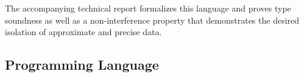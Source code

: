 The accompanying technical report \cite{EnerJ-TR} formalizes this language and
proves type soundness as well as a non-interference
property that demonstrates the desired isolation of approximate and
precise data.


\subsection{Programming Language}


\newcommand{\lit}{\mathcal{L}}
\newcommand{\lost}{\texttt{lost}}
\newcommand{\context}{\texttt{context}}
\renewcommand{\approx}{\texttt{approx}}
\newcommand{\precise}{\texttt{precise}}
\renewcommand{\top}{\texttt{top}}
\newcommand{\comb}{\ensuremath{\triangleright}}

\newcommand{\sG}{\ensuremath{\mathit{^{s}\!\Gamma}}}
\newcommand{\rG}{\ensuremath{\mathit{^{r}\!\Gamma}}}



\newcommand\predefskip[0]{\vspace{2mm plus1mm}\hspace*{3mm}}
\renewenvironment{ottdefnblock}[3][]{\predefskip \small\framebox{\mbox{#2}}\quad #3\\[0pt]}{}

\renewcommand{\ottdrule}[4][]{{\displaystyle\frac{\begin{array}{l}#2\end{array}}{#3}\ \ottdrulename{#4}}}

\renewcommand{\ottusedrule}[1]{\hspace*{7mm}$#1$}


